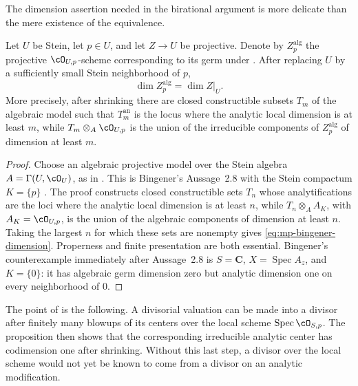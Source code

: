 The dimension assertion needed in the birational argument is more delicate
than the mere existence of the equivalence.

\begin{proposition}\label{prop:mp-bingener-dimension}
Let $U$ be Stein, let $p\in U$, and let $Z\to U$ be projective.
Denote by $Z_p^{\mathrm{alg}}$ the projective
$\cO_{U,p}$-scheme corresponding to its germ under
.  After replacing $U$ by a
sufficiently small Stein neighborhood of $p$,
\[
                 \dim Z_p^{\mathrm{alg}}=\dim Z|_U.
\tag{59.7b}\label{eq:mp-bingener-dimension}
\]
More precisely, after shrinking there are closed constructible subsets
$T_m$ of the algebraic model such that $T_m^{\mathrm{an}}$ is the locus where
the analytic local dimension is at least $m$, while
$T_m\otimes_A\cO_{U,p}$ is the union of the irreducible components of
$Z_p^{\mathrm{alg}}$ of dimension at least $m$.
\end{proposition}

\begin{proof}
Choose an algebraic projective model over the Stein algebra
$A=\Gamma(U,\cO_U)$, as in
.  This is Bingener's
Aussage~2.8 with the Stein compactum $K=\{p\}$
\cite[Aussage~2.8]{Bingener76Stein}.  The proof constructs closed
constructible sets $T_n$ whose analytifications are the loci where the
analytic local dimension is at least $n$, while
$T_n\otimes_A A_K$, with $A_K=\cO_{U,p}$, is the union of the
algebraic components of dimension at least $n$.  Taking the largest
$n$ for which these sets are nonempty gives
\eqref{eq:mp-bingener-dimension}.  Properness and finite presentation are
both essential.  Bingener's counterexample immediately after Aussage~2.8
is $S=\mathbf C$, $X=\operatorname{Spec}A_z$, and $K=\{0\}$: it has
algebraic germ dimension zero but analytic dimension one on every
neighborhood of $0$.
\end{proof}

The point of  is the following.  A
divisorial valuation can be made into a divisor after finitely many blowups
of its centers over the local scheme $\operatorname{Spec}\cO_{S,p}$.
The proposition then shows that the corresponding irreducible analytic
center has codimension one after shrinking.  Without this last step, a
divisor over the local scheme would not yet be known to come from a divisor
on an analytic modification.

